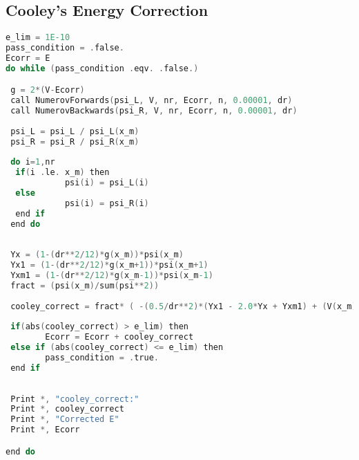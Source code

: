 \documentclass{article}
\begin{document}
    \subsection{Cooley's Energy Correction}
    \begin{lstlisting}[language=C, label=Cooley]
e_lim = 1E-10
pass_condition = .false.
Ecorr = E
do while (pass_condition .eqv. .false.)

 g = 2*(V-Ecorr)
 call NumerovForwards(psi_L, V, nr, Ecorr, n, 0.00001, dr)
 call NumerovBackwards(psi_R, V, nr, Ecorr, n, 0.00001, dr)
 
 psi_L = psi_L / psi_L(x_m)
 psi_R = psi_R / psi_R(x_m)
 
 do i=1,nr
  if(i .le. x_m) then
	    	psi(i) = psi_L(i)
  else
	    	psi(i) = psi_R(i)
  end if
 end do
 
 
 Yx = (1-(dr**2/12)*g(x_m))*psi(x_m)
 Yx1 = (1-(dr**2/12)*g(x_m+1))*psi(x_m+1)
 Yxm1 = (1-(dr**2/12)*g(x_m-1))*psi(x_m-1)
 fract = (psi(x_m)/sum(psi**2))
 
 cooley_correct = fract* ( -(0.5/dr**2)*(Yx1 - 2.0*Yx + Yxm1) + (V(x_m)-Ecorr)*psi(x_m))
 
 if(abs(cooley_correct) > e_lim) then
    	Ecorr = Ecorr + cooley_correct
 else if (abs(cooley_correct) <= e_lim) then
    	pass_condition = .true.
 end if
 
 
 Print *, "cooley_correct:"
 Print *, cooley_correct
 Print *, "Corrected E"
 Print *, Ecorr

end do
    	
    \end{lstlisting}
    
\end{document}

